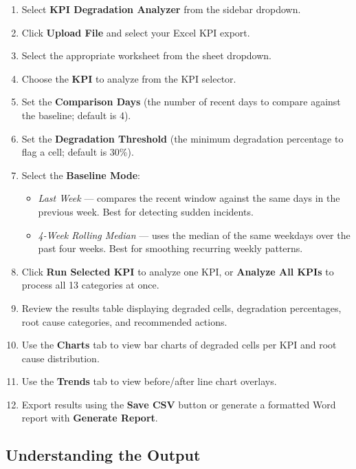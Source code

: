 \begin{enumerate}
    \item Select \textbf{KPI Degradation Analyzer} from the sidebar dropdown.
    \item Click \textbf{Upload File} and select your Excel KPI export.
    \item Select the appropriate worksheet from the sheet dropdown.
    \item Choose the \textbf{KPI} to analyze from the KPI selector.
    \item Set the \textbf{Comparison Days} (the number of recent days to compare against the baseline; default is 4).
    \item Set the \textbf{Degradation Threshold} (the minimum degradation percentage to flag a cell; default is 30\%).
    \item Select the \textbf{Baseline Mode}:
        \begin{itemize}
            \item \textit{Last Week} — compares the recent window against the same days in the previous week. Best for detecting sudden incidents.
            \item \textit{4-Week Rolling Median} — uses the median of the same weekdays over the past four weeks. Best for smoothing recurring weekly patterns.
        \end{itemize}
    \item Click \textbf{Run Selected KPI} to analyze one KPI, or \textbf{Analyze All KPIs} to process all 13 categories at once.
    \item Review the results table displaying degraded cells, degradation percentages, root cause categories, and recommended actions.
    \item Use the \textbf{Charts} tab to view bar charts of degraded cells per KPI and root cause distribution.
    \item Use the \textbf{Trends} tab to view before/after line chart overlays.
    \item Export results using the \textbf{Save CSV} button or generate a formatted Word report with \textbf{Generate Report}.
\end{enumerate}

\subsection{Understanding the Output}

